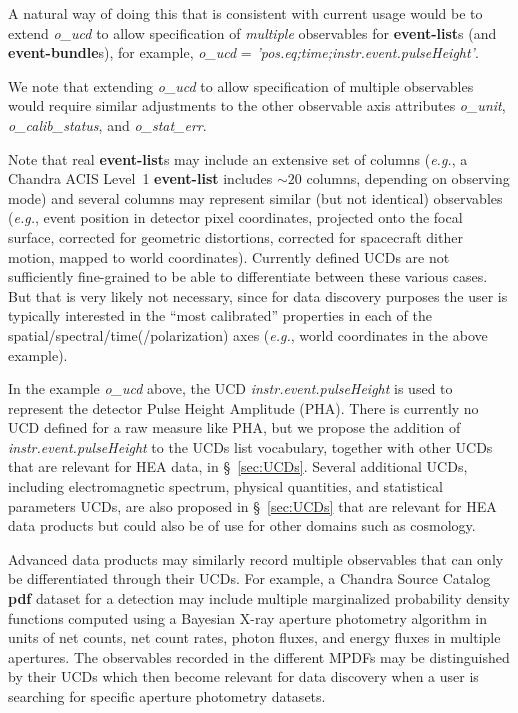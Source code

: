 \documentclass[11pt,a4paper]{ivoa}
\begin{document}
A natural way of doing this that is consistent with current usage would be to extend {\em o\_ucd\/} to allow specification of {\em multiple\/} observables for {\bf event-list}s (and {\bf event-bundle}s), for example, {\em o\_ucd\/} = {\em 'pos.eq;time;instr.event.pulse\-Height'\/}.

We note that extending {\em o\_ucd\/} to allow specification of multiple observables would require similar adjustments to the other observable axis attributes {\em o\_unit\/}, {\em o\_calib\_status\/}, and {\em o\_stat\_err\/}.

Note that real {\bf event-list}s may include an extensive set of columns ({\em e.g.\/}, a Chandra ACIS Level~1 {\bf event-list} includes $\sim\!20$ columns, depending on observing mode) and several columns may represent similar (but not identical) observables ({\em e.g.\/}, event position in detector pixel coordinates, projected onto the focal surface, corrected for geometric distortions, corrected for spacecraft dither motion, mapped to world coordinates).  Currently defined UCDs are not sufficiently fine-grained to be able to differentiate between these various cases. But that is very likely not necessary, since for data discovery purposes the user is typically interested in the ``most calibrated'' properties in each of the spatial/spectral/time(/polarization) axes ({\em e.g.\/}, world coordinates in the above example).

In the example {\em o\_ucd\/} above, the UCD {\em instr.event.pulseHeight\/} is used to represent the detector Pulse Height Amplitude (PHA)\null. There is currently no UCD defined for a raw measure like PHA, but we propose the addition of {\em instr.event.pulseHeight\/} to the UCDs list vocabulary, together with other UCDs that are relevant for \gls{HEA} data, in \S~\ref{sec:UCDs}.  Several additional UCDs, including electromagnetic spectrum, physical quantities, and statistical parameters UCDs, are also proposed in \S~\ref{sec:UCDs} that are relevant for \gls{HEA} data products but could also be of use for other domains such as cosmology.

Advanced data products may similarly record multiple observables that can only be differentiated through their UCDs. For example, a Chandra Source Catalog {\bf pdf} dataset for a detection may include multiple marginalized probability density functions computed using a Bayesian X-ray aperture photometry algorithm in units of net counts, net count rates, photon fluxes, and energy fluxes in multiple apertures.  The observables recorded in the different MPDFs may be distinguished by their UCDs which then become relevant for data discovery when a user is searching for specific aperture photometry datasets.
\end{document}
